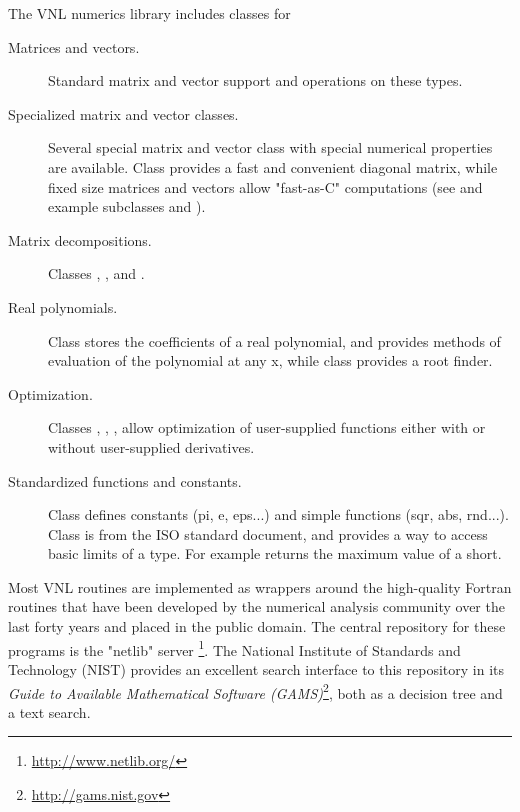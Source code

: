 The VNL numerics library includes classes for
\begin{description}
        \item[Matrices and vectors.] Standard matrix and vector support
        and operations on these types.

        \item[Specialized matrix and vector classes.] Several special matrix
        and vector class with special numerical properties are
        available. Class  provides a fast and
        convenient diagonal matrix, while fixed size matrices and vectors
        allow "fast-as-C" computations (see 
        and example subclasses  and
        ).

        \item[Matrix decompositions.] Classes ,
        , and
        .

        \item[Real polynomials.] Class  stores
        the coefficients of a real polynomial, and provides methods of
        evaluation of the polynomial at any x, while class
         provides a root finder.

        \item[Optimization.] Classes ,
        , ,
         allow optimization of user-supplied
        functions either with or without user-supplied derivatives.

        \item[Standardized functions and constants.] Class 
        defines constants (pi, e, eps...) and simple functions (sqr, abs,
        rnd...). Class  is from the ISO standard
        document, and provides a way to access basic limits of a
        type. For example  returns the maximum
        value of a short.
\end{description}

Most VNL routines are implemented as wrappers around the high-quality Fortran
routines that have been developed by the numerical analysis community over
the last forty years and placed in the public domain. The central repository
for these programs is the "netlib" server \footnote{\url{http://www.netlib.org/}}. The
National Institute of Standards and Technology (NIST) provides an excellent
search interface to this repository in its \emph{Guide to Available Mathematical
Software (GAMS)}\footnote{\url{http://gams.nist.gov}}, both as a decision tree and a
text search.

